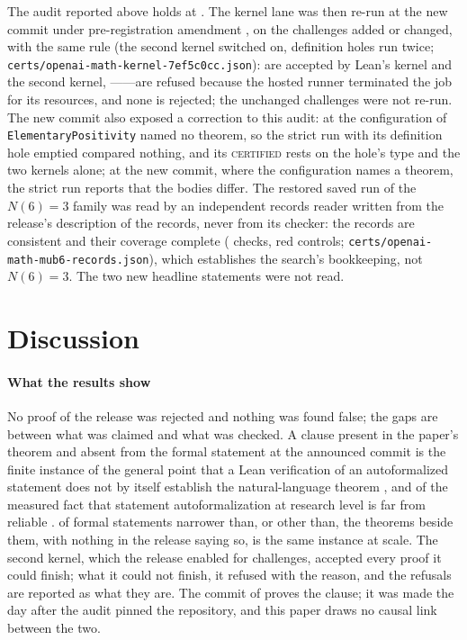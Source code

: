 \documentclass[preprint,11pt,authoryear,a4paper]{elsarticle}
\begin{document}
The audit reported above holds at \MtOaCommit. The kernel lane was then re-run at the new commit under pre-registration amendment \OmTwoAmendment, on the \OmTwoMembers{} challenges added or changed, with the same rule (the second kernel switched on, definition holes run twice; \texttt{certs/openai-math-kernel-7ef5c0cc.json}): \OmTwoCertified{} are accepted by Lean's kernel and the second kernel, \OmTwoRefusedWord{}---\OmTwoRefusedNames---are refused because the hosted runner terminated the job for its resources, and none is rejected; the \OmTwoUnchanged{} unchanged challenges were not re-run. The new commit also exposed a correction to this audit: at \MtOaCommit{} the configuration of \texttt{ElementaryPositivity} named no theorem, so the strict run with its definition hole emptied compared nothing, and its \textsc{certified} rests on the hole's type and the two kernels alone; at the new commit, where the configuration names a theorem, the strict run reports that the bodies differ. The restored saved run of the $N(6) = 3$ family was read by an independent records reader written from the release's description of the records, never from its checker: the records are consistent and their coverage complete (\OmMubChecks{} checks, \OmMubReds{} red controls; \texttt{certs/openai-math-mub6-records.json}), which establishes the search's bookkeeping, not $N(6) = 3$. The two new headline statements were not read.

\section{Discussion}\label{sec:discussion}

\paragraph{What the results show} No proof of the release was rejected and nothing was found false; the gaps are between what was claimed and what was checked. A clause present in the paper's theorem and absent from the formal statement at the announced commit is the finite instance of the general point that a Lean verification of an autoformalized statement does not by itself establish the natural-language theorem \citep{Bastounis26}, and of the measured fact that statement autoformalization at research level is far from reliable \citep{Poiroux25BEq}. \MtOaShort{} of \MtOaStatements{} formal statements narrower than, or other than, the theorems beside them, with nothing in the release saying so, is the same instance at scale. The second kernel, which the release enabled for \MtOaNanodaOn{} challenges, accepted every proof it could finish; what it could not finish, it refused with the reason, and the refusals are reported as what they are. The commit of \NsHeadDate{} proves the clause; it was made the day after the audit pinned the repository, and this paper draws no causal link between the two.
\end{document}

